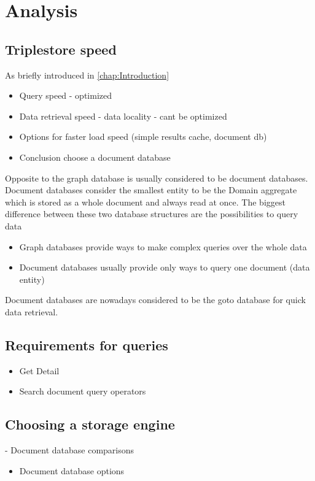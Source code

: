 \chapter{Analysis}
\label{chap:Analysis}

\section{Triplestore speed}
As briefly introduced in \ref{chap:Introduction}

\begin{itemize}
	\item Query speed - optimized
	\item Data retrieval speed - data locality - cant be optimized
	\item Options for faster load speed (simple results cache, document db)
	\item Conclusion choose a document database
\end{itemize}	
Opposite to the graph database is usually considered to be document databases. Document databases consider the smallest entity to be the Domain aggregate which is stored as a whole document and always read at once. The biggest difference between these two database structures are the possibilities to query data
\begin{itemize}
	\item Graph databases provide ways to make complex queries over the whole data
	\item Document databases usually provide only ways to query one document (data entity)
\end{itemize}
Document databases are nowadays considered to be the goto database for quick data retrieval.



\section{Requirements for queries}
\begin{itemize}
	\item Get Detail
	\item Search document query operators
			
\end{itemize}

\section{Choosing a storage engine}
- Document database comparisons
\begin{itemize}
	\item Document database options
\end{itemize}

